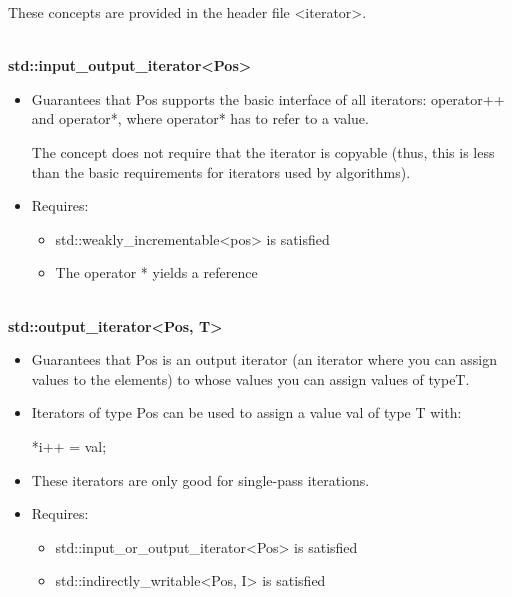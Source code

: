 These concepts are provided in the header file <iterator>.

\noindent
\hspace*{\fill} \\ %
\textbf{std::input\_output\_iterator<Pos>}

\begin{itemize}
\item
Guarantees that Pos supports the basic interface of all iterators: operator++ and operator*, where operator* has to refer to a value.

The concept does not require that the iterator is copyable (thus, this is less than the basic requirements for iterators used by algorithms).

\item
Requires:
\begin{itemize}
\item
std::weakly\_incrementable<pos> is satisfied

\item
The operator * yields a reference
\end{itemize}
\end{itemize}

\noindent
\hspace*{\fill} \\ %
\textbf{std::output\_iterator<Pos, T>}

\begin{itemize}
\item
Guarantees that Pos is an output iterator (an iterator where you can assign values to the elements) to whose values you can assign values of typeT.

\item
Iterators of type Pos can be used to assign a value val of type T with:

\begin{cpp}
*i++ = val;
\end{cpp}

\item
These iterators are only good for single-pass iterations.

\item
Requires:
\begin{itemize}
\item
std::input\_or\_output\_iterator<Pos> is satisfied

\item
std::indirectly\_writable<Pos, I> is satisfied
\end{itemize}
\end{itemize}

